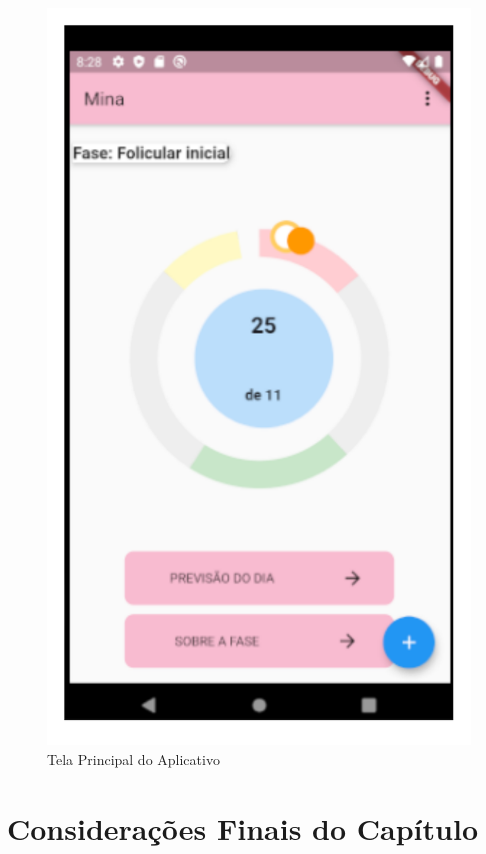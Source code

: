 \begin{figure}[h]
	\centering
	\includegraphics[keepaspectratio=true,scale=0.6]{figuras/apk1.pdf}
	\caption{Tela Principal do Aplicativo}
        \label{fig12}
\end{figure}

\section{Considerações Finais do Capítulo}


